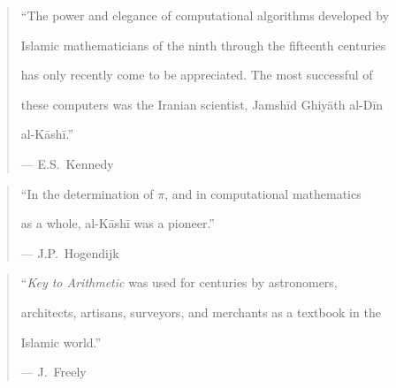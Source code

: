 \documentclass[11pt,a4paper]{article}
\begin{document}
\begin{quote}

``The power and elegance of computational algorithms developed by

Islamic mathematicians of the ninth through the fifteenth centuries

has only recently come to be appreciated. The most successful of

these computers was the Iranian scientist, Jamsh\=id Ghiy\=ath al-D\=in

al-K\=ash\=i.''

\begin{flushright}

--- E.S.\ Kennedy

\end{flushright}

\end{quote}



\vspace{0.3cm}



\begin{quote}

``In the determination of $\pi$, and in computational mathematics

as a whole, al-K\=ash\=i was a pioneer.''

\begin{flushright}

--- J.P.\ Hogendijk

\end{flushright}

\end{quote}



\vspace{0.3cm}



\begin{quote}

``\textit{Key to Arithmetic} was used for centuries by astronomers,

architects, artisans, surveyors, and merchants as a textbook in the

Islamic world.''

\begin{flushright}

--- J.\ Freely

\end{flushright}

\end{quote}
\end{document}
